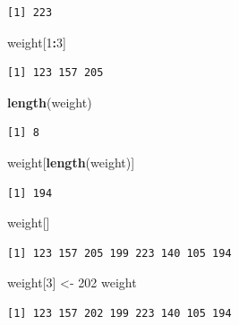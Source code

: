 \documentclass[
]{krantz}
\makeatletter
\newenvironment{Shaded}{\begin{snugshade}}{\end{snugshade}}
\newcommand{\DecValTok}[1]{\textcolor[rgb]{0.06,0.06,0.06}{#1}}
\newcommand{\KeywordTok}[1]{\textcolor[rgb]{0.27,0.27,0.27}{\textbf{#1}}}
\newcommand{\NormalTok}[1]{#1}
\newcommand{\OperatorTok}[1]{\textcolor[rgb]{0.43,0.43,0.43}{\textbf{#1}}}
\newcommand{\StringTok}[1]{\textcolor[rgb]{0.5,0.5,0.5}{#1}}
\newenvironment{kframe}{%
\medskip{}
\setlength{\fboxsep}{.8em}
 \def\at@end@of@kframe{}%
 \ifinner\ifhmode%
  \def\at@end@of@kframe{\end{minipage}}%
  \begin{minipage}{\columnwidth}%
 \fi\fi%
 \def\FrameCommand##1{\hskip\@totalleftmargin \hskip-\fboxsep
 \colorbox{shadecolor}{##1}\hskip-\fboxsep
     \hskip-\linewidth \hskip-\@totalleftmargin \hskip\columnwidth}%
 \MakeFramed {\advance\hsize-\width
   \@totalleftmargin\z@ \linewidth\hsize
   \@setminipage}}%
 {\par\unskip\endMakeFramed%
 \at@end@of@kframe}
\renewenvironment{Shaded}{\begin{kframe}}{\end{kframe}}
\makeatother
\begin{document}
\begin{verbatim}
[1] 223
\end{verbatim}

\begin{Shaded}
\begin{Highlighting}[]
\NormalTok{weight[}\DecValTok{1}\OperatorTok{:}\DecValTok{3}\NormalTok{]}
\end{Highlighting}
\end{Shaded}

\begin{verbatim}
[1] 123 157 205
\end{verbatim}

\begin{Shaded}
\begin{Highlighting}[]
\KeywordTok{length}\NormalTok{(weight)}
\end{Highlighting}
\end{Shaded}

\begin{verbatim}
[1] 8
\end{verbatim}

\begin{Shaded}
\begin{Highlighting}[]
\NormalTok{weight[}\KeywordTok{length}\NormalTok{(weight)]}
\end{Highlighting}
\end{Shaded}

\begin{verbatim}
[1] 194
\end{verbatim}

\begin{Shaded}
\begin{Highlighting}[]
\NormalTok{weight[]}
\end{Highlighting}
\end{Shaded}

\begin{verbatim}
[1] 123 157 205 199 223 140 105 194
\end{verbatim}

\begin{Shaded}
\begin{Highlighting}[]
\NormalTok{weight[}\DecValTok{3}\NormalTok{] \textless{}{-}}\StringTok{ }\DecValTok{202}
\NormalTok{weight}
\end{Highlighting}
\end{Shaded}

\begin{verbatim}
[1] 123 157 202 199 223 140 105 194
\end{verbatim}
\end{document}
